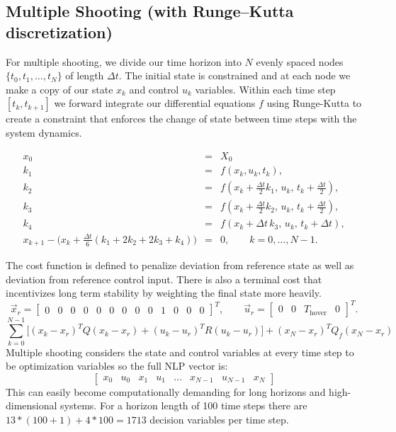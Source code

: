 \documentclass[]{article}
\begin{document}
\subsection*{Multiple Shooting (with Runge–Kutta discretization)}
For multiple shooting, we divide our time horizon into $N$ evenly spaced nodes $\{ t_0, t_1, \ldots, t_N \}$ of length $\Delta t$. The initial state is constrained and at each node we make a copy of our state $x_k$ and control $u_k$ variables. Within each time step $[ t_k, t_{k+1}]$ we forward integrate our differential equations $f$ using Runge-Kutta to create a constraint that enforces the change of state between time steps with the system dynamics. 

        \begin{eqnarray}
        \nonumber
        x_0 & = & X_0 \\[6pt] \nonumber
        k_1 & = & f(x_k, u_k, t_k), \\[6pt] \nonumber
        k_2 & = & f\!\left(x_k + \tfrac{\Delta t}{2} k_1,\, u_k,\, t_k + \tfrac{\Delta t}{2}\right), \\[6pt] \nonumber
        k_3 & = & f\!\left(x_k + \tfrac{\Delta t}{2} k_2,\, u_k,\, t_k + \tfrac{\Delta t}{2}\right), \\[6pt] \nonumber
        k_4 & = & f\!\left(x_k + \Delta t\, k_3,\, u_k,\, t_k + \Delta t\right), \\[10pt]
        x_{k+1} - \Big(x_k + \tfrac{\Delta t}{6}(k_1 + 2k_2 + 2k_3 + k_4)\Big) &=& 0, 
        \qquad k = 0,\dots, N-1.
        \label{eq:rkstate}
        \end{eqnarray}
        
The cost function is defined to penalize deviation from reference state as well as deviation from reference control input. There is also a terminal cost that incentivizes long term stability by weighting the final state more heavily.
        \[
        \vec{x}_r =
        \begin{bmatrix}
        0 & 0 & 0 & 0 & 0 & 0 & 0 & 0 & 0 & 1 & 0 & 0 & 0
        \end{bmatrix}^{\!T},
        \qquad
        \vec{u}_r =
        \begin{bmatrix}
        0 & 0 & T_{\text{hover}} & 0
        \end{bmatrix}^{\!T}.
        \]
         \begin{equation}
         	 \sum_{k=0}^{N-1}  \Big[(x_k -  x_{r})^T Q (x_k - x_{r}) + (u_k -  u_{r})^T R (u_k - u_{r}) \Big] + (x_N -  x_{r})^T Q_f (x_N - x_{r})
         \end{equation}
Multiple shooting considers the state and control variables at every time step to be optimization variables so the full NLP vector is:
        \[
        \begin{bmatrix}
        x_0 & u_0 & x_1 & u_1 & ... & x_{N-1} & u_{N-1} & x_N
        \end{bmatrix}
        \]
This can easily become computationally demanding for long horizons and high-dimensional systems. For a horizon length of 100 time steps there are $13 * (100+1)+4*100=1713$ decision variables per time step.
\end{document}
